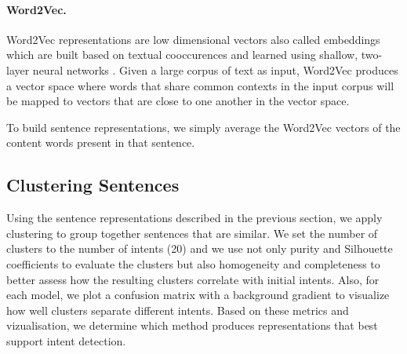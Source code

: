 \documentclass[11pt]{article}
\begin{document}
\paragraph{Word2Vec.} Word2Vec representations are low dimensional vectors also called embeddings which are built based on textual
cooccurences and learned using shallow, two-layer neural networks
\cite{Mikolov2013EfficientEO}. Given a large corpus of text as input,
Word2Vec produces a vector space where words that share common
contexts in the input corpus will be mapped to vectors that are close
to one another in the vector space.


To build sentence representations, we simply average the Word2Vec
vectors of the content words present in that sentence.





\subsection{Clustering Sentences}
\label{subsec:clustering}
Using the sentence representations described in the previous section,
we apply clustering to group together sentences that are similar.  We
set the number of clusters to the number of intents (20) and we use
not only purity and Silhouette coefficients to evaluate the clusters
but also homogeneity and completeness to better assess how the
resulting clusters correlate with initial intents. Also, for each
model, we plot a confusion matrix with a background gradient to
visualize how well clusters separate different intents. Based on these
metrics and vizualisation, we determine which method produces
representations that best support intent detection.
\end{document}
